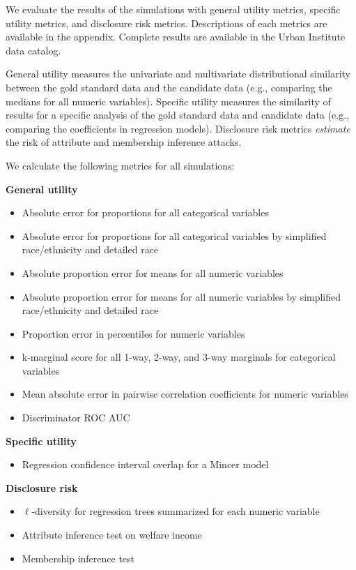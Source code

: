 \documentclass[
]{urban-formatting}
\providecommand{\tightlist}{%
  \setlength{\itemsep}{0pt}\setlength{\parskip}{0pt}}\usepackage{longtable,booktabs,array}
\begin{document}
We evaluate the results of the simulations with general utility metrics,
specific utility metrics, and disclosure risk metrics. Descriptions of
each metrics are available in the appendix. Complete results are
available in the Urban Institute data catalog.

General utility measures the univariate and multivariate distributional
similarity between the gold standard data and the candidate data (e.g.,
comparing the medians for all numeric variables). Specific utility
measures the similarity of results for a specific analysis of the gold
standard data and candidate data (e.g., comparing the coefficients in
regression models). Disclosure risk metrics \emph{estimate} the risk of
attribute and membership inference attacks.

We calculate the following metrics for all simulations:

\textbf{General utility}

\begin{itemize}
\tightlist
\item
  Absolute error for proportions for all categorical variables
\item
  Absolute error for proportions for all categorical variables by
  simplified race/ethnicity and detailed race
\item
  Absolute proportion error for means for all numeric variables
\item
  Absolute proportion error for means for all numeric variables by
  simplified race/ethnicity and detailed race
\item
  Proportion error in percentiles for numeric variables
\item
  k-marginal score for all 1-way, 2-way, and 3-way marginals for
  categorical variables
\item
  Mean absolute error in pairwise correlation coefficients for numeric
  variables
\item
  Discriminator ROC AUC
\end{itemize}

\textbf{Specific utility}

\begin{itemize}
\tightlist
\item
  Regression confidence interval overlap for a Mincer model
\end{itemize}

\textbf{Disclosure risk}

\begin{itemize}
\tightlist
\item
  \(\ell\)-diversity for regression trees summarized for each numeric
  variable
\item
  Attribute inference test on welfare income
\item
  Membership inference test
\end{itemize}
\end{document}
